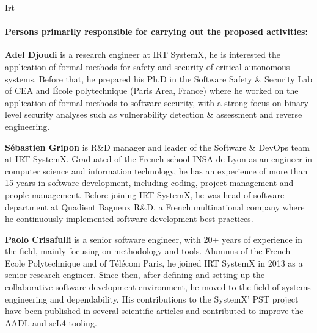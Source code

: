 \begin{sitedescription}{Irt}
\paragraph*{Persons primarily responsible for carrying out the proposed activities:}

\begin{compactitem} %

\item{\bf Adel Djoudi} is a research engineer at IRT SystemX, he is interested the application of formal methods for safety and security of critical autonomous systems. Before that, he prepared his Ph.D in the Software Safety \& Security Lab of CEA and École polytechnique (Paris Area, France) where he worked on the application of formal methods to software security, with a strong focus on binary-level security analyses such as vulnerability detection \& assessment and reverse engineering.

\item{\bf Sébastien Gripon} is R\&D manager and leader of the Software \& DevOps team at IRT SystemX. Graduated of the French school INSA de Lyon as an engineer in computer science and information technology, he has an experience of more than 15 years in software development, including coding, project management and people management. Before joining IRT SystemX, he was head of software department at Quadient Bagneux R\&D, a French multinational company where he continuously implemented software development best practices.

\item{\bf Paolo Crisafulli} is a senior software engineer, with 20+ years of experience in the field, mainly focusing on methodology and tools. Alumnus of the French Ecole Polytechnique and of Télécom Paris, he joined IRT SystemX in 2013 as a senior research engineer. Since then, after defining and setting up the collaborative software development environment, he moved to the field of systems engineering and dependability. His contributions to the SystemX’ PST project have been published in several scientific articles and contributed to improve the AADL and seL4 tooling.

\end{compactitem}

\end{sitedescription}

